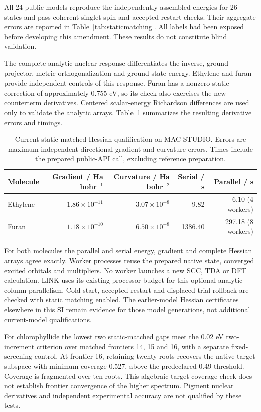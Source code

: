 \documentclass[11pt,a4paper]{article}
\begin{document}
All 24 public models reproduce the independently assembled energies for
26 states and pass coherent-singlet spin and accepted-restart checks.
Their aggregate errors are reported in Table~\ref{tab:staticmatching}.
All labels had been exposed before developing this amendment. These
results do not constitute blind validation.


The complete analytic nuclear response differentiates the inverse,
ground projector, metric orthogonalization and ground-state energy.
Ethylene and furan provide independent controls of this response. Furan
has a nonzero static correction of approximately 0.755 eV, so its check
also exercises the new counterterm derivatives. Centered scalar-energy
Richardson differences are used only to validate the analytic arrays.
Table~\ref{tab:staticderivatives} summarizes the resulting derivative errors
and timings.
\begin{table}[htbp]\centering
\caption{Current static-matched Hessian qualification on MAC-STUDIO.
Errors are maximum independent directional gradient and curvature
errors. Times include the prepared public-API call, excluding reference
preparation.}\label{tab:staticderivatives}
\begin{tabular}{lrrrr}
\toprule
Molecule & Gradient / Ha bohr$^{-1}$ & Curvature / Ha bohr$^{-2}$ & Serial / s & Parallel / s\\
\midrule
Ethylene & $1.86\times10^{-11}$ & $3.07\times10^{-8}$ & 9.82 & 6.10 (4 workers)\\
Furan & $1.18\times10^{-10}$ & $6.50\times10^{-8}$ & 1386.40 & 297.18 (8 workers)\\
\bottomrule
\end{tabular}
\end{table}

For both molecules the parallel and serial energy, gradient and complete
Hessian arrays agree exactly. Worker processes reuse the prepared native
state, converged excited orbitals and multipliers. No worker launches a
new SCC, TDA or DFT calculation. LINK uses its existing processor budget
for this optional analytic column parallelism. Cold start, accepted
restart and displaced-trial rollback are checked with static matching
enabled. The earlier-model Hessian certificates elsewhere in this SI
remain evidence for those model generations, not additional current-model
qualifications.

For chlorophyllide the lowest two static-matched gaps meet the 0.02 eV
two-increment criterion over matched frontiers 14, 15 and 16, with a
separate fixed-screening control. At frontier 16, retaining twenty roots
recovers the native target subspace with minimum coverage 0.527, above
the predeclared 0.49 threshold. Coverage is fragmented over ten roots.
This algebraic target-coverage check does not establish frontier
convergence of the higher spectrum. Pigment nuclear derivatives and
independent experimental accuracy are not qualified by these tests.
\end{document}
